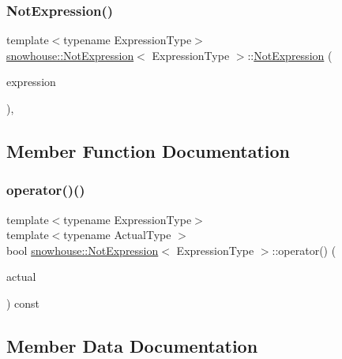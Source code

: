 \subsubsection{\texorpdfstring{NotExpression()}{NotExpression()}}
{\footnotesize\ttfamily template$<$typename Expression\+Type$>$ \\
\mbox{\hyperlink{structsnowhouse_1_1NotExpression}{snowhouse\+::\+Not\+Expression}}$<$ Expression\+Type $>$\+::\mbox{\hyperlink{structsnowhouse_1_1NotExpression}{Not\+Expression}} (\begin{DoxyParamCaption}\item[{const Expression\+Type \&}]{expression }\end{DoxyParamCaption})\hspace{0.3cm}{\ttfamily [inline]}, {\ttfamily [explicit]}}



\subsection{Member Function Documentation}
\mbox{\label{structsnowhouse_1_1NotExpression_ae7eff61f740ff505a2e656f6422944d2}} 
\subsubsection{\texorpdfstring{operator()()}{operator()()}}
{\footnotesize\ttfamily template$<$typename Expression\+Type$>$ \\
template$<$typename Actual\+Type $>$ \\
bool \mbox{\hyperlink{structsnowhouse_1_1NotExpression}{snowhouse\+::\+Not\+Expression}}$<$ Expression\+Type $>$\+::operator() (\begin{DoxyParamCaption}\item[{const Actual\+Type \&}]{actual }\end{DoxyParamCaption}) const\hspace{0.3cm}{\ttfamily [inline]}}



\subsection{Member Data Documentation}
\mbox{\label{structsnowhouse_1_1NotExpression_a1d271febb24f6898dff2ea7950342238}} 

